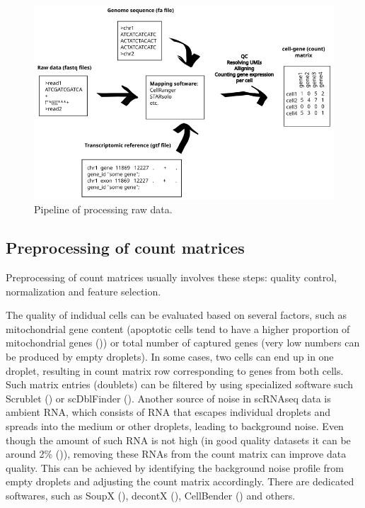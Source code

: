 \begin{figure}
  \centering
  \includegraphics[width=\linewidth]{images/rawdata.png}
  \caption{Pipeline of processing raw data.}
  \label{fig:rawData}
\end{figure}

\subsection{Preprocessing of count matrices}
\label{sec:preprocessingMatrices}

Preprocessing of count matrices usually involves these steps:
quality control, normalization and feature selection.

The quality of indidual cells can be evaluated based on several factors, such as mitochondrial gene content
(apoptotic cells tend to have a higher proportion of mitochondrial genes (\cite{Heumos2023})) or
total number of captured genes (very low numbers can be produced by empty droplets).
In some cases, two cells can end up in one droplet,
resulting in count matrix row corresponding to genes from  both cells.
Such matrix entries (doublets) can be filtered by using specialized software
such Scrublet (\cite{Wolock2019}) or scDblFinder (\cite{Germain2022}).
Another source of noise in scRNAseq data is ambient RNA,
which consists of RNA that escapes individual droplets and spreads into the medium or other droplets,
leading to background noise.
Even though the amount of such RNA is not high (in good quality datasets it can be around 2\% (\cite{Young2020})),
removing these RNAs from the count matrix can improve data quality.
This can be achieved by identifying the background noise profile from empty droplets and
adjusting the count matrix accordingly.
There are dedicated softwares,
such as SoupX (\cite{Young2020}), decontX (\cite{Yang2020}), CellBender (\cite{Fleming2023}) and others.

